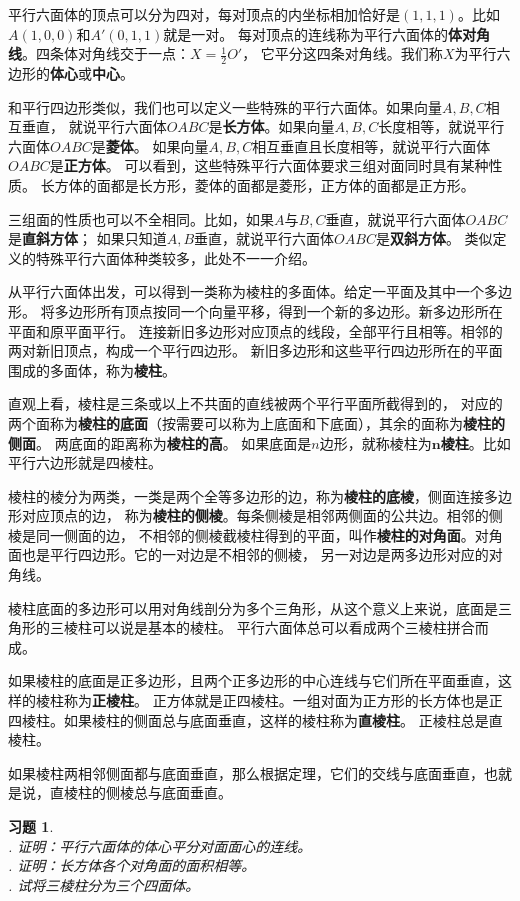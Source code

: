 \documentclass[12pt,UTF8]{ctexbook}
\newtheorem{xt}{习题}[section]
\begin{document}
平行六面体的顶点可以分为四对，每对顶点的内坐标相加恰好是$(1,1,1)$。比如$A(1,0,0)$和$A'(0,1,1)$就是一对。
每对顶点的连线称为平行六面体的\textbf{体对角线}。四条体对角线交于一点：$X=\frac{1}{2}O'$，
它平分这四条对角线。我们称$X$为平行六边形的\textbf{体心}或\textbf{中心}。

和平行四边形类似，我们也可以定义一些特殊的平行六面体。如果向量$A,B,C$相互垂直，
就说平行六面体$OABC$是\textbf{长方体}。如果向量$A,B,C$长度相等，就说平行六面体$OABC$是\textbf{菱体}。
如果向量$A,B,C$相互垂直且长度相等，就说平行六面体$OABC$是\textbf{正方体}。
可以看到，这些特殊平行六面体要求三组对面同时具有某种性质。
长方体的面都是长方形，菱体的面都是菱形，正方体的面都是正方形。

三组面的性质也可以不全相同。比如，如果$A$与$B,C$垂直，就说平行六面体$OABC$是\textbf{直斜方体}；
如果只知道$A,B$垂直，就说平行六面体$OABC$是\textbf{双斜方体}。
类似定义的特殊平行六面体种类较多，此处不一一介绍。


从平行六面体出发，可以得到一类称为棱柱的多面体。给定一平面及其中一个多边形。
将多边形所有顶点按同一个向量平移，得到一个新的多边形。新多边形所在平面和原平面平行。
连接新旧多边形对应顶点的线段，全部平行且相等。相邻的两对新旧顶点，构成一个平行四边形。
新旧多边形和这些平行四边形所在的平面围成的多面体，称为\textbf{棱柱}。

直观上看，棱柱是三条或以上不共面的直线被两个平行平面所截得到的，
对应的两个面称为\textbf{棱柱的底面}（按需要可以称为上底面和下底面），其余的面称为\textbf{棱柱的侧面}。
两底面的距离称为\textbf{棱柱的高}。
如果底面是$n$边形，就称棱柱为$\mathbf{n}$\textbf{棱柱}。比如平行六边形就是四棱柱。

棱柱的棱分为两类，一类是两个全等多边形的边，称为\textbf{棱柱的底棱}，侧面连接多边形对应顶点的边，
称为\textbf{棱柱的侧棱}。每条侧棱是相邻两侧面的公共边。相邻的侧棱是同一侧面的边，
不相邻的侧棱截棱柱得到的平面，叫作\textbf{棱柱的对角面}。对角面也是平行四边形。它的一对边是不相邻的侧棱，
另一对边是两多边形对应的对角线。

棱柱底面的多边形可以用对角线剖分为多个三角形，从这个意义上来说，底面是三角形的三棱柱可以说是基本的棱柱。
平行六面体总可以看成两个三棱柱拼合而成。 

如果棱柱的底面是正多边形，且两个正多边形的中心连线与它们所在平面垂直，这样的棱柱称为\textbf{正棱柱}。
正方体就是正四棱柱。一组对面为正方形的长方体也是正四棱柱。如果棱柱的侧面总与底面垂直，这样的棱柱称为\textbf{直棱柱}。
正棱柱总是直棱柱。

如果棱柱两相邻侧面都与底面垂直，那么根据定理，它们的交线与底面垂直，也就是说，直棱柱的侧棱总与底面垂直。
\begin{xt}
    \mbox{}\\
    . 证明：平行六面体的体心平分对面面心的连线。\\
    . 证明：长方体各个对角面的面积相等。\\
    . 试将三棱柱分为三个四面体。
\end{xt}
\end{document}
